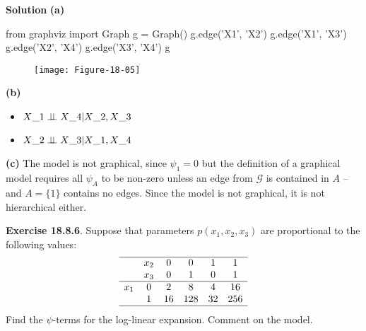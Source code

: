 \textbf{Solution}
\textbf{(a)}

\begin{python}
from graphviz import Graph
g = Graph()
g.edge('X1', 'X2')
g.edge('X1', 'X3')
g.edge('X2', 'X4')
g.edge('X3', 'X4')
g
\end{python}

\begin{figure}[H]
\centering
\texttt{[image: Figure-18-05]}
\end{figure}

\textbf{(b)}
\begin{itemize}[tightlist]
\item
  $X\_{1} \perp\!\!\!\perp X\_{4} | X\_{2}, X\_{3} $
\item
  $X\_{2} \perp\!\!\!\perp X\_{3} | X\_{1}, X\_{4} $
\end{itemize}
\textbf{(c)} The model is not graphical, since \(\psi_{1} = 0\) but the
definition of a graphical model requires all \(\psi_A\) to be non-zero
unless an edge from \(\mathcal{G}\) is contained in \(A\) -- and
\(A = \{ 1 \}\) contains no edges.
Since the model is not graphical, it is not hierarchical either.

\textbf{Exercise 18.8.6}. Suppose that parameters \(p(x_{1}, x_{2}, x_{3})\)
are proportional to the following values:
\[
\begin{array}{cccccc}
\hline
    & x_{2} & 0  & 0   & 1  & 1 \\
    & x_{3} & 0  & 1   & 0  & 1 \\
\hline
x_{1} & 0   & 2  &   8 &  4 & 16 \\
    & 1   & 16 & 128 & 32 & 256 \\
\hline
\end{array}
\]
Find the \(\psi\)-terms for the log-linear expansion. Comment on the
model.

